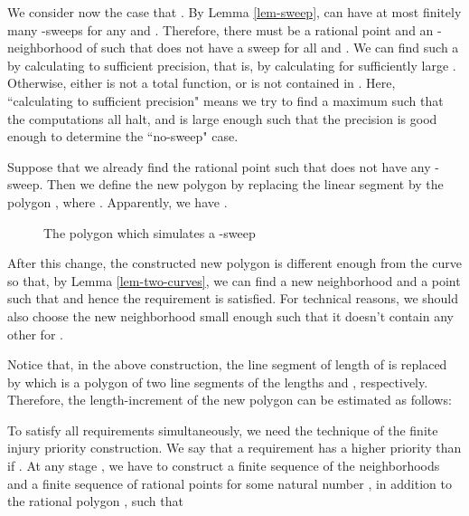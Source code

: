 \documentclass{LMCS}
\theoremstyle{plain}
\begin{document}
We consider now the case that . By Lemma \ref{lem-sweep},  can have at most finitely many -sweeps for any  and . Therefore, there must be a rational point  and an -neighborhood  of  such that  does not have a  sweep for all  and . We can find such a  by calculating  to sufficient precision, that is, by calculating  for sufficiently large . Otherwise, either  is not a total function, or  is not contained in . Here, ``calculating  to sufficient precision" means we try to find a maximum  such that the computations  all halt, and  is large enough such that the precision  is good enough to determine the ``no-sweep" case.

Suppose that we already find the rational point  such that  does not have any -sweep. Then we define the new polygon  by replacing the linear segment  by the polygon  , where . Apparently, we have .

\begin{figure}[h]
\begin{center}
\end{center}
\caption{The polygon  which simulates a -sweep}\label{fig-K-R}
\end{figure}


After this change, the constructed new polygon  is different enough from the curve  so that, by Lemma \ref{lem-two-curves}, we can find a new neighborhood  and  a point  such that  and hence the requirement  is satisfied. For technical reasons, we should also choose the new neighborhood  small enough such that it doesn't contain any other  for .

\noindent Notice that, in the above construction, the line segment  of length  of  is replaced by  which is a polygon of two line segments of the lengths  and , respectively. Therefore, the length-increment of the new polygon can be estimated as follows:


To satisfy all requirements  simultaneously, we need the technique of the finite injury priority construction. We say that a requirement  has a higher priority than  if . At any stage , we have to construct a finite sequence  of the neighborhoods and a finite sequence of rational points  for some natural number , in addition to the rational polygon ,  such that
\end{document}
